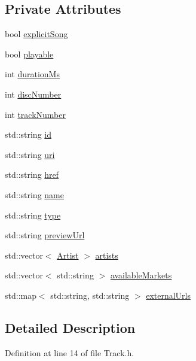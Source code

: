 \subsection*{Private Attributes}
\begin{DoxyCompactItemize}
\item 
bool \mbox{\hyperlink{class_track_a4ab310f40214ce50f8ddc119f533a360}{explicit\+Song}}
\item 
bool \mbox{\hyperlink{class_track_aaa74477dfb24cc996daa2c446d0756d7}{playable}}
\item 
int \mbox{\hyperlink{class_track_a12951180d03f23515f1023b21195f3d6}{duration\+Ms}}
\item 
int \mbox{\hyperlink{class_track_a8a03d7cc2a83a7c7e4637cf25262dcb9}{disc\+Number}}
\item 
int \mbox{\hyperlink{class_track_af56e882e909fd8dc4d3c1cda82302b3f}{track\+Number}}
\item 
std\+::string \mbox{\hyperlink{class_track_aa71bccc3071caa1c2440ad260d55e152}{id}}
\item 
std\+::string \mbox{\hyperlink{class_track_a6df780e2ff80b5d1c5865d417b261d94}{uri}}
\item 
std\+::string \mbox{\hyperlink{class_track_a20872bbafa6e5cde75ee793c0dd80afb}{href}}
\item 
std\+::string \mbox{\hyperlink{class_track_aa6ac5b105e372efdbc1d6449cd4003a4}{name}}
\item 
std\+::string \mbox{\hyperlink{class_track_afd1b18db0ac2edd9d86d269061bb0e3d}{type}}
\item 
std\+::string \mbox{\hyperlink{class_track_ae04dbb4cc5e34f20e61d792bbb9d23c1}{preview\+Url}}
\item 
std\+::vector$<$ \mbox{\hyperlink{class_artist}{Artist}} $>$ \mbox{\hyperlink{class_track_a8700b8ebbd19db2dc2468a8a870ca8c4}{artists}}
\item 
std\+::vector$<$ std\+::string $>$ \mbox{\hyperlink{class_track_a10c873784726872d8360102f9a3d78d9}{available\+Markets}}
\item 
std\+::map$<$ std\+::string, std\+::string $>$ \mbox{\hyperlink{class_track_ac654eea298e20bc0a85f33dc62ef5313}{external\+Urls}}
\end{DoxyCompactItemize}


\subsection{Detailed Description}


Definition at line 14 of file Track.\+h.



